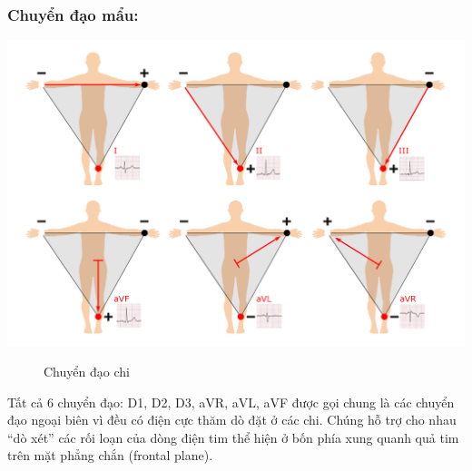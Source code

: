 \subsubsection{Chuyển đạo mẩu:}
\begin{center}
    \includegraphics[scale=.25]{image/week1/chuyendaochi.png}
    \begin{figure}[htp]
    \begin{center}
    \end{center}
    \caption{Chuyển đạo chi \cite{chuyendao}}
    \end{figure}
\end{center}
Tất cả 6 chuyển đạo: D1, D2, D3, aVR, aVL, aVF được gọi chung là các chuyển đạo ngoại biên vì đều có điện cực thăm dò đặt ở các chi. Chúng hỗ trợ cho nhau “dò xét” các rối loạn của dòng điện tim thể hiện ở bốn phía xung quanh quả tim trên mặt phẳng chắn (frontal plane).

